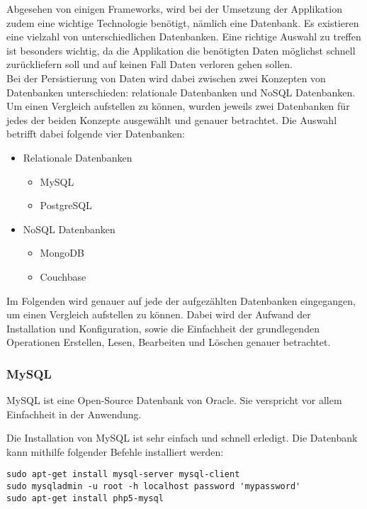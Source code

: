
Abgesehen von einigen Frameworks, wird bei der Umsetzung der Applikation zudem eine wichtige Technologie benötigt, nämlich eine Datenbank. Es existieren eine vielzahl von unterschiedlichen Datenbanken. Eine richtige Auswahl zu treffen ist besonders wichtig, da die Applikation die benötigten Daten möglichst schnell zurückliefern soll und auf keinen Fall Daten verloren gehen sollen. \\
Bei der Persistierung von Daten wird dabei zwischen zwei Konzepten von Datenbanken unterschieden: relationale Datenbanken und NoSQL Datenbanken. Um einen Vergleich aufstellen zu können, wurden jeweils zwei Datenbanken für jedes der beiden Konzepte ausgewählt und genauer betrachtet. Die Auswahl betrifft dabei folgende vier Datenbanken:\\
\begin{itemize}
\item Relationale Datenbanken
\begin{itemize}
\item MySQL
\item PostgreSQL
\end{itemize}
\item NoSQL Datenbanken
\begin{itemize}
\item MongoDB
\item Couchbase
\end{itemize}
\end{itemize}

Im Folgenden wird genauer auf jede der aufgezählten Datenbanken eingegangen, um einen Vergleich aufstellen zu können. Dabei wird der Aufwand der Installation und Konfiguration, sowie die Einfachheit der grundlegenden Operationen Erstellen, Lesen, Bearbeiten und Löschen genauer betrachtet.

\subsubsection{MySQL}
MySQL ist eine Open-Source Datenbank von Oracle. Sie verspricht vor allem Einfachheit in der Anwendung.\cite{ABOUTMYSQL}

Die Installation von MySQL ist sehr einfach und schnell erledigt. Die Datenbank kann mithilfe folgender Befehle installiert werden:
\begin{lstlisting}[caption=Installation von MySQL \cite{MYSQLINSTALL}]
sudo apt-get install mysql-server mysql-client
sudo mysqladmin -u root -h localhost password 'mypassword'
sudo apt-get install php5-mysql
\end{lstlisting}

